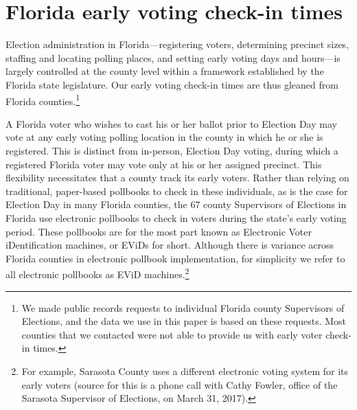 \documentclass[12pt,titlepage]{article}
\begin{document}
\section*{Florida early voting check-in times}

Election administration in Florida---registering voters, determining
precinct sizes, staffing and locating polling places, and setting
early voting days and hours---is largely controlled at the county
level within a framework established by the Florida state
legislature. Our early voting check-in times are thus gleaned from
Florida counties.\footnote{We made public records requests to
  individual Florida county Supervisors of Elections, and the data we
  use in this paper is based on these requests.  Most counties that we
  contacted were not able to provide us with early voter check-in
  times.}


A Florida voter who wishes to cast his or her ballot prior to Election Day may vote at
any early voting polling location in the county in which he or she is
registered. This is distinct from in-person, Election Day voting,
during which a registered Florida voter may vote only at his or her
assigned precinct.  This flexibility necessitates that a county track
its early voters.  Rather than relying on traditional, paper-based
pollbooks to check in these individuals, as is the case for Election
Day in many Florida counties, the 67 county Supervisors of Elections
in Florida use electronic pollbooks to check in voters during the
state's early voting period.  These pollbooks are for the most part
known as Electronic Voter iDentification machines, or EViDs for short.
Although there is variance across Florida counties in electronic
pollbook implementation, for simplicity we refer to all electronic
pollbooks as EViD machines.\footnote{For example, Sarasota County uses
  a different electronic voting system for its early voters (source
  for this is a phone call with Cathy Fowler, office of the Sarasota
  Supervisor of Elections, on March 31, 2017).}

\end{document}
